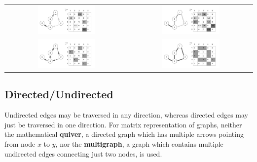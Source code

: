 \begin{table}[H]
  \centering
\begin{tabu}{cc}
	\includegraphics[width=0.49\textwidth]{images/directed_weighted_graph}
	 &
	\includegraphics[width=0.49\textwidth]{images/undirected_weighted_graph} \\
	\includegraphics[width=0.49\textwidth]{images/directed_graph}  &
	\includegraphics[width=0.49\textwidth]{images/undirected_graph} 
\end{tabu}
\end{table}


\subsection{Directed/Undirected}

Undirected edges may be traversed in any direction, whereas directed edges may just be traversed in one direction. For matrix representation of graphs, neither the mathematical \textbf{quiver}, a directed graph which has multiple arrows pointing from node $x$ to $y$, nor the \textbf{multigraph}, a graph which contains multiple undirected edges connecting just two nodes, is used.


